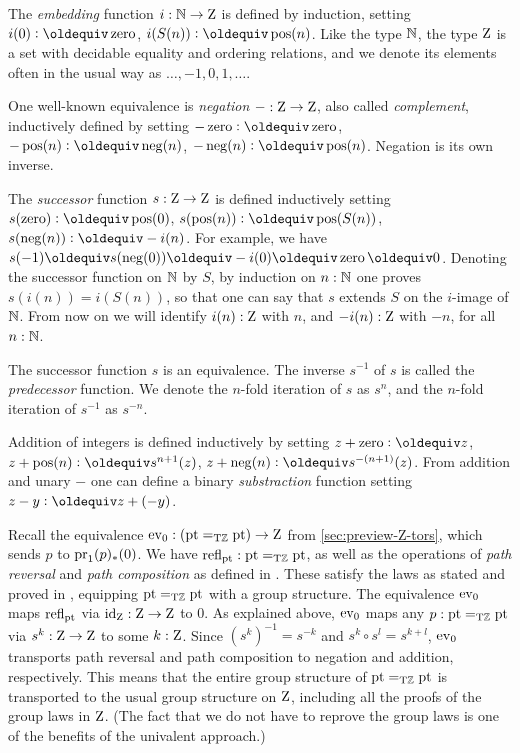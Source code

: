 \documentclass[a4paper,12pt]{amsart}
\begin{document}
The \emph{embedding} function $i:\mathbb{N}\to\mathrm{Z}$ is defined by induction,
setting $i(0)\defeq \zzero$, $i(S(n))\defeq \zpos(n)$.
Like the type $\mathbb{N}$, the type $\mathrm{Z}$ is a set with decidable equality
and ordering relations,
and we denote its elements often in the usual way as $\ldots,-1,0,1,\ldots$.

One well-known equivalence is \emph{negation} ${-}:\mathrm{Z}\to\mathrm{Z}$,
also called \emph{complement}, inductively defined by setting
$-\zzero\defeq \zzero$,
$-\zpos(n)\defeq \zneg(n)$,
$-\zneg(n)\defeq \zpos(n)$.
Negation is its own inverse.

The \emph{successor} function $s:\mathrm{Z}\to\mathrm{Z}$ is defined inductively setting
$s(\zzero)\defeq \zpos(0)$,
$s(\zpos(n))\defeq \zpos(S(n))$,
$s(\zneg(n))\defeq -i(n)$. For example, we have
$s(-1)\jdeq s(\zneg(0))\jdeq -i(0) \jdeq \zzero \jdeq 0$.
{Denoting the successor function on $\mathbb{N}$ by $S$,
by} induction on $n:\mathbb{N}$ one proves $s(i(n))=i(S(n))$,
so that one can say that $s$ extends $S$ on the $i$-image of $\mathbb{N}$.
From now on we will identify $i(n):\mathrm{Z}$ with $n$,
and $-i(n):\mathrm{Z}$ with $-n$, for all $n:\mathbb{N}$.

The successor function $s$ is an equivalence.
The inverse $s^{-1}$ of $s$ is called the \emph{predecessor} function.
We denote the $n$-fold iteration of $s$ as $s^n$, and
the $n$-fold iteration of $s^{-1}$ as $s^{-n}$.

Addition of integers is defined inductively by setting
$z + \zzero\defeq z$,
$z + \zpos(n)\defeq s^{n+1}(z)$,
$z + \zneg(n)\defeq s^{-(n+1)}(z)$.
From addition and unary $-$ one can define a binary
\emph{substraction} function setting $z-y \defeq z+(-y)$.


Recall the equivalence $\mathrm{ev}_0 : ({\mathord{\mathrm{pt}}}=_{\mathrm{T}\mathbb{Z}} {\mathord{\mathrm{pt}}})\to\mathrm{Z}$ from
\cref{sec:preview-Z-tors}, which sends $p$ to $\operatorname{pr}_1(p)_*(0)$.
We have $\mathop{{\mathrm{refl}}_{{\mathord{\mathrm{pt}}}}} : {\mathord{\mathrm{pt}}}=_{\mathrm{T}\mathbb{Z}} {\mathord{\mathrm{pt}}}$, as well as the operations
of \emph{path reversal} and \emph{path composition} as defined
in \cite[2.1]{hottbook}. These satisfy the laws as stated
and proved in \cite[Lemma 2.1.4]{hottbook}, equipping ${\mathord{\mathrm{pt}}}=_{\mathrm{T}\mathbb{Z}} {\mathord{\mathrm{pt}}}$
with a group structure.
The equivalence $\mathrm{ev}_0$ maps $\mathop{{\mathrm{refl}}_{{\mathord{\mathrm{pt}}}}}$ via $\mathord{\mathrm{id}}_{\mathrm{Z}} : \mathrm{Z}\to\mathrm{Z}$ to $0$.
As explained above, $\mathrm{ev}_0$ maps any $p : {\mathord{\mathrm{pt}}}=_{\mathrm{T}\mathbb{Z}} {\mathord{\mathrm{pt}}}$
via $s^k : \mathrm{Z}\to\mathrm{Z}$ to some $k:\mathrm{Z}$. Since $(s^k)^{-1} = s^{-k}$
and $s^k \circ s^l = s^{k+l}$, $\mathrm{ev}_0$ transports path reversal
and path composition to negation and addition, respectively.
This means that the entire group structure of ${\mathord{\mathrm{pt}}}=_{\mathrm{T}\mathbb{Z}} {\mathord{\mathrm{pt}}}$
is transported to the usual group structure on $\mathrm{Z}$,
including all the proofs of the group laws in $\mathrm{Z}$.
(The fact that we do not have to reprove the group laws
is one of the benefits of the univalent approach.)
\end{document}
